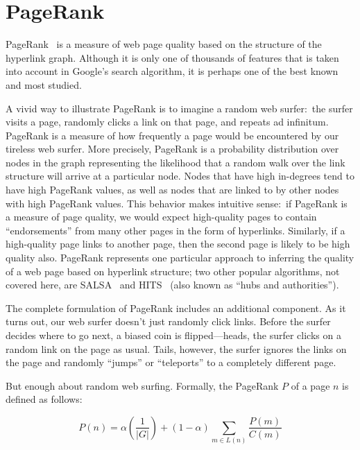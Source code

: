 \section{PageRank}
\label{chapter-graphs:PageRank}

PageRank~\cite{Page_etal_1999} is a measure of web page quality based
on the structure of the hyperlink graph.  Although it is only one of
thousands of features that is taken into account in Google's search
algorithm, it is perhaps one of the best known and most studied.

A vivid way to illustrate PageRank is to imagine a random web
surfer:\ the surfer visits a page, randomly clicks a link on that
page, and repeats ad infinitum.  PageRank is a measure of how
frequently a page would be encountered by our tireless web surfer.
More precisely, PageRank is a probability distribution over nodes in
the graph representing the likelihood that a random walk over the link
structure will arrive at a particular node.  Nodes that have high
in-degrees tend to have high PageRank values, as well as nodes that
are linked to by other nodes with high PageRank values.  This behavior
makes intuitive sense:\ if PageRank is a measure of page quality, we
would expect high-quality pages to contain ``endorsements'' from many
other pages in the form of hyperlinks.  Similarly, if a high-quality
page links to another page, then the second page is likely to be high
quality also.  PageRank represents one particular approach to
inferring the quality of a web page based on hyperlink structure; two
other popular algorithms, not covered here, are
SALSA~\cite{Lempel_Moran_TOIS2001} and HITS~\cite{Kleinberg_JACM1999}
(also known as ``hubs and authorities'').

The complete formulation of PageRank includes an additional component.
As it turns out, our web surfer doesn't just randomly click links.
Before the surfer decides where to go next, a biased coin is
flipped---heads, the surfer clicks on a random link on the page as
usual.  Tails, however, the surfer ignores the links on the page and
randomly ``jumps'' or ``teleports'' to a completely different page.

But enough about random web surfing.  Formally, the PageRank $P$ of a
page $n$ is defined as follows:

\begin{equation}
P(n) = \alpha \left( \frac{1}{|G|} \right) + (1-\alpha) \sum_{m \in L(n)} \frac{P(m)}{C(m)}
\end{equation}

